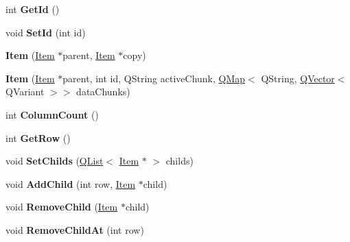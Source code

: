 \begin{DoxyCompactItemize}
\item 
int {\bfseries Get\+Id} ()\hypertarget{class_item_a3466b4b51b244ccbcac853ee7240af47}{}\label{class_item_a3466b4b51b244ccbcac853ee7240af47}

\item 
void {\bfseries Set\+Id} (int id)\hypertarget{class_item_a46a50959228845fc8d4c1a1e3cdfc9a3}{}\label{class_item_a46a50959228845fc8d4c1a1e3cdfc9a3}

\item 
{\bfseries Item} (\hyperlink{class_item}{Item} $\ast$parent, \hyperlink{class_item}{Item} $\ast$copy)\hypertarget{class_item_aef96722ef425ab3794691db85ba4abd6}{}\label{class_item_aef96722ef425ab3794691db85ba4abd6}

\item 
{\bfseries Item} (\hyperlink{class_item}{Item} $\ast$parent, int id, Q\+String active\+Chunk, \hyperlink{class_q_map}{Q\+Map}$<$ Q\+String, \hyperlink{class_q_vector}{Q\+Vector}$<$ Q\+Variant $>$$>$ data\+Chunks)\hypertarget{class_item_a27fb96423d6e35b384b226bc3408b348}{}\label{class_item_a27fb96423d6e35b384b226bc3408b348}

\item 
int {\bfseries Column\+Count} ()\hypertarget{class_item_ae09610bc79b15b17cce0428661b14a88}{}\label{class_item_ae09610bc79b15b17cce0428661b14a88}

\item 
int {\bfseries Get\+Row} ()\hypertarget{class_item_adad3b372e59e9b033d3f8dc371fac651}{}\label{class_item_adad3b372e59e9b033d3f8dc371fac651}

\item 
void {\bfseries Set\+Childs} (\hyperlink{class_q_list}{Q\+List}$<$ \hyperlink{class_item}{Item} $\ast$ $>$ childs)\hypertarget{class_item_a10447a235cd6db703b59ed7b33ad7607}{}\label{class_item_a10447a235cd6db703b59ed7b33ad7607}

\item 
void {\bfseries Add\+Child} (int row, \hyperlink{class_item}{Item} $\ast$child)\hypertarget{class_item_a6a98cb08e94548f37614132f663f5dfb}{}\label{class_item_a6a98cb08e94548f37614132f663f5dfb}

\item 
void {\bfseries Remove\+Child} (\hyperlink{class_item}{Item} $\ast$child)\hypertarget{class_item_ab77ee89c1d573571d46276904ddea022}{}\label{class_item_ab77ee89c1d573571d46276904ddea022}

\item 
void {\bfseries Remove\+Child\+At} (int row)\hypertarget{class_item_a88f43c96e836f5a1473763fd0e8846bb}{}\label{class_item_a88f43c96e836f5a1473763fd0e8846bb}


\end{DoxyCompactItemize}
